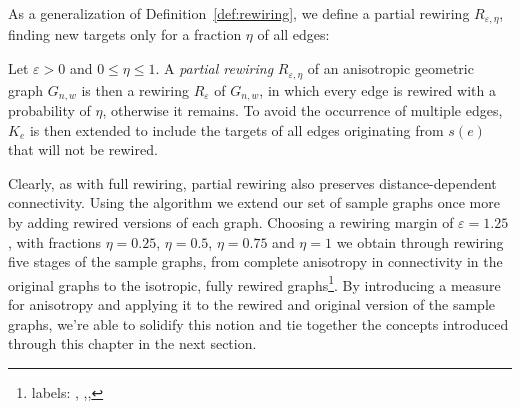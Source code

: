 As a generalization of Definition~\ref{def:rewiring}, we define a
partial rewiring $R_{\varepsilon, \eta}$, finding new targets only for
a fraction $\eta$ of all edges:

\begin{definition}Let $\varepsilon > 0$ and $0 \leq \eta \leq 1$. A
  \textit{partial rewiring} $R_{\varepsilon,\eta}$ of an anisotropic
  geometric graph $G_{n,w}$ is then a rewiring $R_{\varepsilon}$ of
  $G_{n,w}$, in which every edge is rewired with a probability of
  $\eta$, otherwise it remains. To avoid the occurrence of multiple
  edges, $K_e$ is then extended to include the targets of all edges
  originating from $s(e)$ that will not be rewired.
\end{definition}

Clearly, as with full rewiring, partial rewiring also preserves
distance-dependent connectivity. Using the algorithm we
extend our set of sample graphs once more by adding rewired versions
of each graph. Choosing a rewiring margin of $\varepsilon = 1.25$,
with fractions $\eta = 0.25$, $\eta = 0.5$, $\eta = 0.75$ and $\eta =
1$ we obtain through rewiring five stages of the sample graphs, from
complete anisotropy in connectivity in the original graphs to the
isotropic, fully rewired graphs\footnote{labels:
  ,
  ,,}. By introducing a
measure for anisotropy and applying it to the rewired and original
version of the sample graphs, we're able to solidify this notion and
tie together the concepts introduced through this chapter in the next
section.





 



